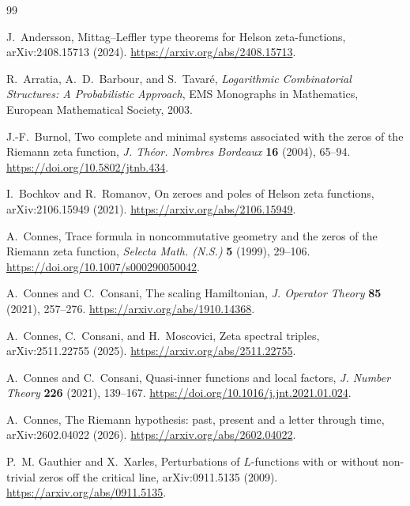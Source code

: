 \documentclass[11pt]{article}
\theoremstyle{definition}
\theoremstyle{remark}
\begin{document}
\begin{thebibliography}{99}

J.~Andersson,
\newblock Mittag--Leffler type theorems for Helson zeta-functions,
\newblock arXiv:2408.15713 (2024).
\newblock \url{https://arxiv.org/abs/2408.15713}.

R.~Arratia, A.~D.~Barbour, and S.~Tavar\'e,
\newblock \emph{Logarithmic Combinatorial Structures: A Probabilistic Approach},
\newblock EMS Monographs in Mathematics, European Mathematical Society, 2003.

J.-F.~Burnol,
\newblock Two complete and minimal systems associated with the zeros of the Riemann zeta function,
\newblock \emph{J. Th\'eor. Nombres Bordeaux} \textbf{16} (2004), 65--94.
\newblock \url{https://doi.org/10.5802/jtnb.434}.

I.~Bochkov and R.~Romanov,
\newblock On zeroes and poles of Helson zeta functions,
\newblock arXiv:2106.15949 (2021).
\newblock \url{https://arxiv.org/abs/2106.15949}.

A.~Connes,
\newblock Trace formula in noncommutative geometry and the zeros of the Riemann zeta function,
\newblock \emph{Selecta Math. (N.S.)} \textbf{5} (1999), 29--106.
\newblock \url{https://doi.org/10.1007/s000290050042}.

A.~Connes and C.~Consani,
\newblock The scaling Hamiltonian,
\newblock \emph{J. Operator Theory} \textbf{85} (2021), 257--276.
\newblock \url{https://arxiv.org/abs/1910.14368}.

A.~Connes, C.~Consani, and H.~Moscovici,
\newblock Zeta spectral triples,
\newblock arXiv:2511.22755 (2025).
\newblock \url{https://arxiv.org/abs/2511.22755}.

A.~Connes and C.~Consani,
\newblock Quasi-inner functions and local factors,
\newblock \emph{J. Number Theory} \textbf{226} (2021), 139--167.
\newblock \url{https://doi.org/10.1016/j.jnt.2021.01.024}.

A.~Connes,
\newblock The Riemann hypothesis: past, present and a letter through time,
\newblock arXiv:2602.04022 (2026).
\newblock \url{https://arxiv.org/abs/2602.04022}.

P.~M. Gauthier and X.~Xarles,
\newblock Perturbations of \(L\)-functions with or without non-trivial zeros off the critical
line,
\newblock arXiv:0911.5135 (2009).
\newblock \url{https://arxiv.org/abs/0911.5135}.


\end{thebibliography}
\end{document}
